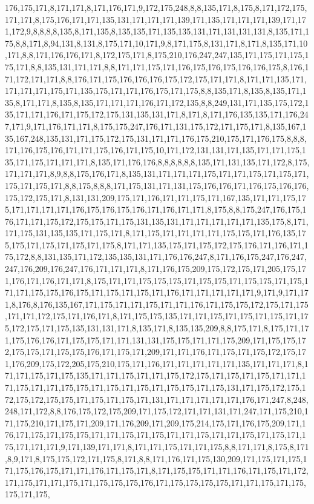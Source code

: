 176,175,171,8,171,171,8,171,176,171,9,172,175,248,8,8,135,171,8,175,8,171,172,175,171,171,8,175,176,171,171,135,131,171,171,171,139,171,135,171,171,171,139,171,171,172,9,8,8,8,8,135,8,171,135,8,135,135,171,135,135,131,171,131,131,131,8,135,171,175,8,8,171,8,94,131,8,131,8,175,171,10,171,9,8,171,175,8,131,171,8,171,8,135,171,10,171,8,8,171,176,176,171,8,172,175,171,8,175,210,176,247,247,135,171,175,171,175,175,171,8,8,135,131,171,171,8,8,171,171,175,171,176,175,176,175,176,176,175,8,176,171,172,171,171,8,8,176,171,175,176,176,176,175,172,175,171,171,8,171,171,135,171,171,171,171,175,171,135,175,171,171,176,175,171,175,8,8,135,171,8,135,8,135,171,135,8,171,171,8,135,8,135,171,171,171,176,171,172,135,8,8,249,131,171,135,175,172,135,171,171,176,171,175,172,175,131,135,131,171,8,171,8,171,176,135,135,171,176,247,171,9,171,176,171,171,8,175,175,247,176,171,131,175,172,171,175,171,8,135,167,135,167,248,135,131,171,175,172,175,131,171,171,176,175,210,175,171,176,175,8,8,8,171,176,175,176,171,171,175,176,171,175,10,171,172,131,131,171,135,171,171,175,135,171,175,171,171,171,8,135,171,176,176,8,8,8,8,8,8,135,171,131,135,171,172,8,175,171,171,171,8,9,8,8,175,176,171,8,135,131,171,171,171,175,171,171,175,171,175,171,175,171,175,171,8,8,175,8,8,8,171,175,131,171,131,175,176,176,171,176,175,176,176,175,172,175,171,8,131,131,209,175,171,176,171,171,175,171,167,135,171,171,175,175,171,171,171,171,176,175,176,175,176,171,176,171,171,8,175,8,8,175,247,176,175,176,171,171,175,172,175,175,171,175,131,135,131,171,171,171,171,171,135,175,8,171,171,175,131,135,135,171,175,171,8,171,175,171,171,171,171,175,175,171,176,135,175,175,171,175,171,175,171,175,8,171,171,135,175,171,175,172,175,176,171,176,171,175,172,8,8,131,135,171,172,135,135,131,171,176,176,247,8,171,176,175,247,176,247,247,176,209,176,247,176,171,171,171,8,171,176,175,209,175,172,175,171,205,175,171,176,171,176,171,171,8,175,171,171,175,175,175,171,175,175,171,175,175,171,175,171,171,175,175,176,175,171,175,171,175,171,176,171,171,171,171,171,9,171,9,171,171,8,176,8,176,135,167,171,175,171,171,175,171,171,176,171,175,175,172,175,171,175,171,171,172,175,171,176,171,8,171,175,175,135,171,171,175,171,175,171,175,171,175,172,175,171,175,135,131,131,171,8,135,171,8,135,135,209,8,8,175,171,8,175,171,171,175,176,176,171,175,175,171,171,131,131,175,175,171,171,175,209,171,175,175,172,175,175,171,175,175,176,171,175,171,209,171,171,176,171,175,171,175,172,175,171,176,209,175,172,205,175,210,175,171,176,171,171,171,171,171,135,171,171,171,8,171,171,175,171,175,135,171,171,175,171,171,175,172,175,171,175,171,175,171,171,171,175,171,171,175,175,171,175,171,175,171,175,175,171,175,131,171,175,172,175,172,175,172,175,175,171,175,171,175,171,131,171,171,171,171,171,176,171,247,8,248,248,171,172,8,8,176,175,172,175,209,171,175,172,171,171,131,171,247,171,175,210,171,175,210,171,175,171,209,171,176,209,171,209,175,214,175,171,176,175,209,171,176,171,175,171,175,175,171,171,175,171,175,171,171,175,171,171,175,171,175,171,175,171,171,171,9,171,139,171,171,8,171,171,175,171,171,175,8,8,171,171,8,175,8,171,8,9,171,8,175,175,172,171,175,8,171,8,8,171,176,171,175,130,209,171,175,171,175,171,175,176,175,171,171,176,171,175,171,8,171,175,175,171,171,176,171,175,171,172,171,175,171,171,175,171,175,175,175,176,171,175,175,175,175,171,171,175,171,175,175,171,175,